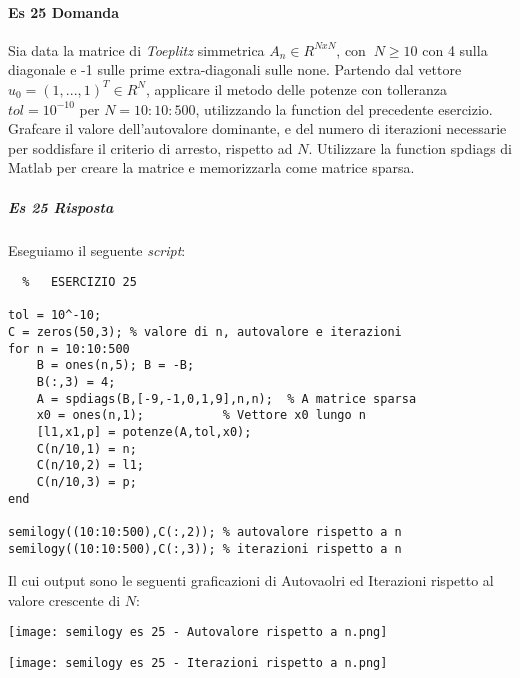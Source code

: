 \documentclass[a4paper]{report}
\begin{document}
\paragraph{Es 25 Domanda}
Sia data la matrice di \emph{Toeplitz} simmetrica $A_n \in R^{NxN}$, con $ \ N \geq 10$ con  4 sulla diagonale e -1 sulle prime extra-diagonali sulle none. Partendo dal vettore $u_0 = (1,...,1)^T \in R^N$, applicare il metodo delle potenze con tolleranza $tol = 10^{-10}$ per $N=10:10:500$, utilizzando la function del precedente esercizio. Grafcare il valore dell'autovalore dominante, e del numero di iterazioni necessarie per soddisfare il criterio di arresto, rispetto ad $N$. Utilizzare la function spdiags di Matlab per creare
la matrice e memorizzarla come matrice sparsa.
\subparagraph{Es 25 Risposta}
Eseguiamo il seguente \emph{script}:\\
\begin{lstlisting}	%	ESERCIZIO 25

tol = 10^-10;
C = zeros(50,3); % valore di n, autovalore e iterazioni
for n = 10:10:500
	B = ones(n,5); B = -B;
	B(:,3) = 4;
	A = spdiags(B,[-9,-1,0,1,9],n,n);  % A matrice sparsa
	x0 = ones(n,1);           % Vettore x0 lungo n
	[l1,x1,p] = potenze(A,tol,x0);
	C(n/10,1) = n;
	C(n/10,2) = l1;
	C(n/10,3) = p;
end

semilogy((10:10:500),C(:,2)); % autovalore rispetto a n
semilogy((10:10:500),C(:,3)); % iterazioni rispetto a n
\end{lstlisting}
\newpage Il cui output sono le seguenti graficazioni di Autovaolri ed Iterazioni rispetto al valore crescente di $N$:\\
\begin{center}	%
	\texttt{[image: semilogy es 25 - Autovalore rispetto a n.png]}
\end{center}
\begin{center}	%
	\texttt{[image: semilogy es 25 - Iterazioni rispetto a n.png]}
\end{center}
\newpage
\end{document}
